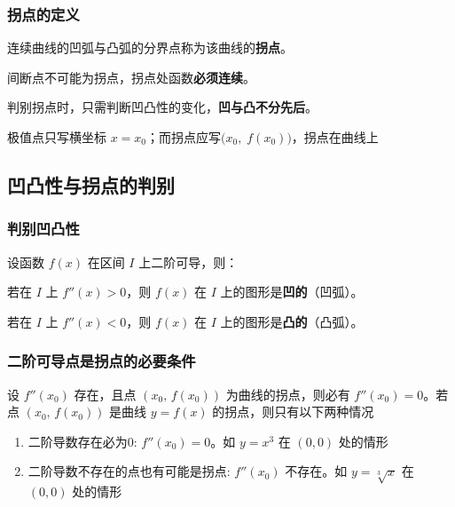 \documentclass[a4paper,12pt]{article}
\begin{document}
    \subsubsection{拐点的定义}

    连续曲线的凹弧与凸弧的分界点称为该曲线的\textbf{拐点}。

    \begin{circlenum}
        \item 间断点不可能为拐点，拐点处函数\textbf{必须连续}。

        \item 判别拐点时，只需判断凹凸性的变化，\textbf{凹与凸不分先后}。

        \item 极值点只写横坐标 $x=x_0$；而拐点应写$\bigl(x_0,\; f(x_0)\bigr)$，拐点在曲线上
    \end{circlenum}

    \subsection{凹凸性与拐点的判别}

    \subsubsection{判别凹凸性}

    设函数 $f(x)$ 在区间 $I$ 上二阶可导，则：

    \begin{circlenum}
        \item 若在 $I$ 上 $f''(x) > 0$，则 $f(x)$ 在 $I$ 上的图形是\textbf{凹的}（凹弧）。

        \item 若在 $I$ 上 $f''(x) < 0$，则 $f(x)$ 在 $I$ 上的图形是\textbf{凸的}（凸弧）。
    \end{circlenum}

    \subsubsection{二阶可导点是拐点的必要条件}

    设 $f''(x_0)$ 存在，且点 $(x_0,\,f(x_0))$ 为曲线的拐点，则必有 $f''(x_0)=0$。若点 $(x_0,\,f(x_0))$ 是曲线 $y = f(x)$ 的拐点，则只有以下两种情况

    \begin{enumerate}
        \item 二阶导数存在必为$0$: $f''(x_0)=0$。如 $y=x^3$ 在 $(0,0)$ 处的情形
        \item 二阶导数不存在的点也有可能是拐点: $f''(x_0)$ 不存在。如 $y=\sqrt[3]{x}$ 在 $(0,0)$ 处的情形
    \end{enumerate}
\end{document}
